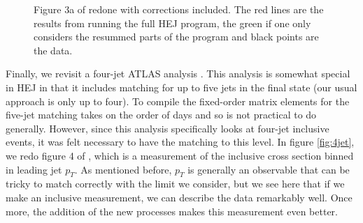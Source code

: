 \begin{figure}[H]
\caption{Figure 3a of \cite{Aad2014} redone with corrections included. The red lines are the results from running the full HEJ program, the green if one only considers the resummed parts of the program and black points are the data.}
\label{fig:newveto3a}
\end{figure}

Finally, we revisit a four-jet ATLAS analysis \cite{Aad2015}. This analysis is somewhat special in HEJ in that it includes matching for up to five jets in the final state (our usual approach is only up to four). To compile the fixed-order matrix elements for the five-jet matching takes on the order of days and so is not practical to do generally. However, since this analysis specifically looks at four-jet inclusive events, it was felt necessary to have the matching to this level. In figure \ref{fig:4jet}, we redo figure 4 of \cite{Aad2015}, which is a measurement of the inclusive cross section binned in leading jet $p_T$. As mentioned before, $p_T$ is generally an observable that can be tricky to match correctly with the limit we consider, but we see here that if we make an inclusive measurement, we can describe the data remarkably well. Once more, the addition of the new processes makes this measurement even better. 

